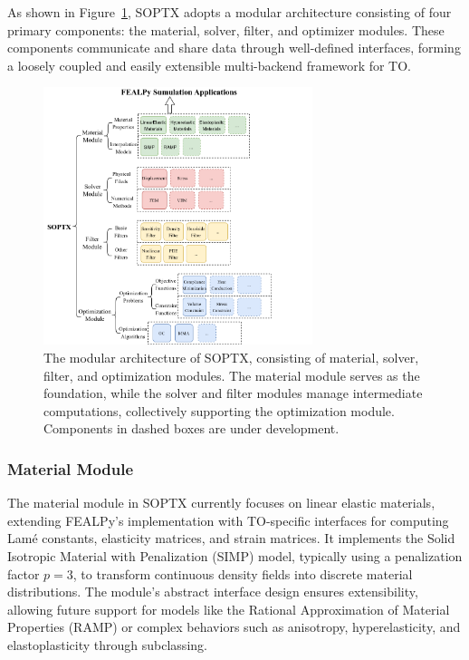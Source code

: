 \documentclass[mathpazo]{cicp}
\begin{document}
As shown in Figure~\ref{fs:fig2}, SOPTX adopts a modular architecture consisting of four primary components: the material, solver, filter, and optimizer modules. These components communicate and share data through well-defined interfaces, forming a loosely coupled and easily extensible multi-backend framework for TO.
\vspace{-0.5ex} %
\begin{figure}[htp]
	\centering
	\includegraphics[width=0.7\textwidth]{figures/soptx_structure.png} %
	\caption{The modular architecture of SOPTX, consisting of material, solver, filter, and optimization modules. The material module serves as the foundation, while the solver and filter modules manage intermediate computations, collectively supporting the optimization module. Components in dashed boxes are under development.}
	\label{fs:fig2}
\end{figure}
\vspace{-0.5ex} %

\subsubsection{Material Module}
The material module in SOPTX currently focuses on linear elastic materials, extending FEALPy’s implementation with TO-specific interfaces for computing Lamé constants, elasticity matrices, and strain matrices. It implements the Solid Isotropic Material with Penalization (SIMP) model, typically using a penalization factor $p = 3$, to transform continuous density fields into discrete material distributions. The module’s abstract interface design ensures extensibility, allowing future support for models like the Rational Approximation of Material Properties (RAMP) or complex behaviors such as anisotropy, hyperelasticity, and elastoplasticity through subclassing.
\end{document}

